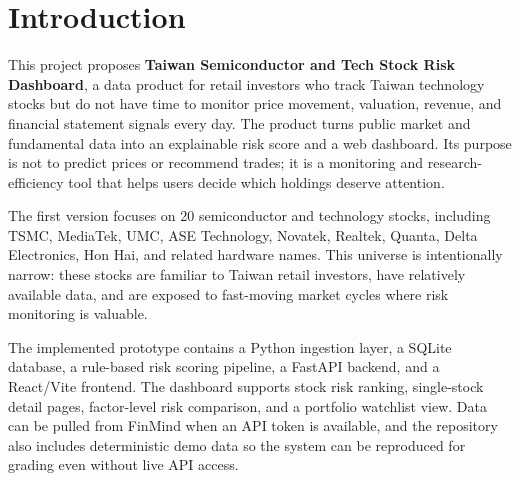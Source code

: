 \section{Introduction}
\label{sec:introduction}

This project proposes \textbf{Taiwan Semiconductor and Tech Stock Risk Dashboard}, a data product for retail investors who track Taiwan technology stocks but do not have time to monitor price movement, valuation, revenue, and financial statement signals every day. The product turns public market and fundamental data into an explainable risk score and a web dashboard. Its purpose is not to predict prices or recommend trades; it is a monitoring and research-efficiency tool that helps users decide which holdings deserve attention.

The first version focuses on 20 semiconductor and technology stocks, including TSMC, MediaTek, UMC, ASE Technology, Novatek, Realtek, Quanta, Delta Electronics, Hon Hai, and related hardware names. This universe is intentionally narrow: these stocks are familiar to Taiwan retail investors, have relatively available data, and are exposed to fast-moving market cycles where risk monitoring is valuable.

The implemented prototype contains a Python ingestion layer, a SQLite database, a rule-based risk scoring pipeline, a FastAPI backend, and a React/Vite frontend. The dashboard supports stock risk ranking, single-stock detail pages, factor-level risk comparison, and a portfolio watchlist view. Data can be pulled from FinMind when an API token is available, and the repository also includes deterministic demo data so the system can be reproduced for grading even without live API access.
